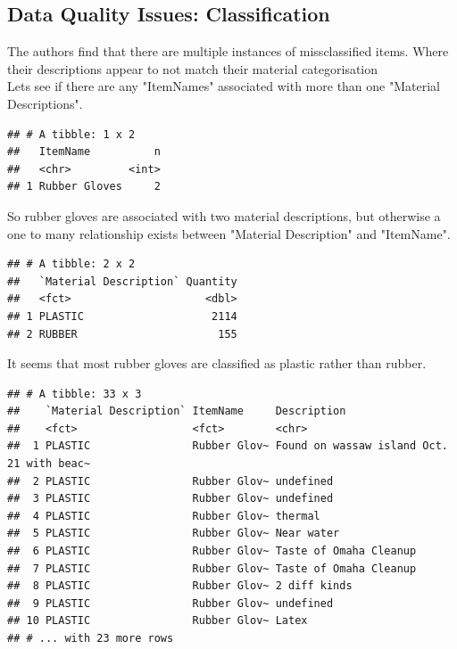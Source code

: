 \documentclass[10pt]{article}\usepackage[]{graphicx}\usepackage[]{color}
\makeatletter
\newenvironment{kframe}{%
 \def\at@end@of@kframe{}%
 \ifinner\ifhmode%
  \def\at@end@of@kframe{\end{minipage}}%
  \begin{minipage}{\columnwidth}%
 \fi\fi%
 \def\FrameCommand##1{\hskip\@totalleftmargin \hskip-\fboxsep
 \colorbox{shadecolor}{##1}\hskip-\fboxsep
     \hskip-\linewidth \hskip-\@totalleftmargin \hskip\columnwidth}%
 \MakeFramed {\advance\hsize-\width
   \@totalleftmargin\z@ \linewidth\hsize
   \@setminipage}}%
 {\par\unskip\endMakeFramed%
 \at@end@of@kframe}
\newenvironment{knitrout}{}{} %
\makeatother
\begin{document}
\subsection{Data Quality Issues: Classification}
The authors find that there are multiple instances of missclassified items. Where their descriptions appear to not match their material categorisation\\
Lets see if there are any "ItemNames" associated with more than one "Material Descriptions".
\begin{knitrout}
\color{fgcolor}\begin{kframe}
\begin{verbatim}
## # A tibble: 1 x 2
##   ItemName          n
##   <chr>         <int>
## 1 Rubber Gloves     2
\end{verbatim}
\end{kframe}
\end{knitrout}
So rubber gloves are associated with two material descriptions, but otherwise a one to many relationship exists between "Material Description" and "ItemName".
\begin{knitrout}
\color{fgcolor}\begin{kframe}
\begin{verbatim}
## # A tibble: 2 x 2
##   `Material Description` Quantity
##   <fct>                     <dbl>
## 1 PLASTIC                    2114
## 2 RUBBER                      155
\end{verbatim}
\end{kframe}
\end{knitrout}
It seems that most rubber gloves are classified as plastic rather than rubber.
\begin{knitrout}
\color{fgcolor}\begin{kframe}
\begin{verbatim}
## # A tibble: 33 x 3
##    `Material Description` ItemName     Description                              
##    <fct>                  <fct>        <chr>                                    
##  1 PLASTIC                Rubber Glov~ Found on wassaw island Oct. 21 with beac~
##  2 PLASTIC                Rubber Glov~ undefined                                
##  3 PLASTIC                Rubber Glov~ undefined                                
##  4 PLASTIC                Rubber Glov~ thermal                                  
##  5 PLASTIC                Rubber Glov~ Near water                               
##  6 PLASTIC                Rubber Glov~ Taste of Omaha Cleanup                   
##  7 PLASTIC                Rubber Glov~ Taste of Omaha Cleanup                   
##  8 PLASTIC                Rubber Glov~ 2 diff kinds                             
##  9 PLASTIC                Rubber Glov~ undefined                                
## 10 PLASTIC                Rubber Glov~ Latex                                    
## # ... with 23 more rows
\end{verbatim}
\end{kframe}
\end{knitrout}
\end{document}
